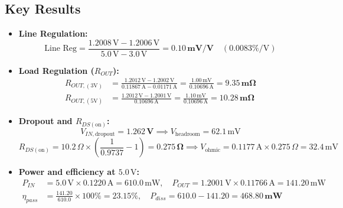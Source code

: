\documentclass[11pt,a4paper]{article}
\begin{document}
\subsection{Key Results}
\begin{itemize}[leftmargin=1.2em, itemsep=0.2em]
    \item \textbf{Line Regulation:}
    \begin{equation}
        \text{Line Reg} = \frac{1.2008\,\text{V} - 1.2006\,\text{V}}{5.0\,\text{V} - 3.0\,\text{V}} = \mathbf{0.10\,\text{mV/V}} \quad (0.0083\%\text{/V})
    \end{equation}
    \item \textbf{Load Regulation ($R_{OUT}$):}
    \begin{align}
        R_{OUT,(3\text{V})} &= \frac{1.2012\,\text{V} - 1.2002\,\text{V}}{0.11867\,\text{A} - 0.01171\,\text{A}} = \frac{1.00\,\text{mV}}{0.10696\,\text{A}} = \mathbf{9.35\,\text{m}\Omega} \\
        R_{OUT,(5\text{V})} &= \frac{1.2012\,\text{V} - 1.2001\,\text{V}}{0.10696\,\text{A}} = \frac{1.10\,\text{mV}}{0.10696\,\text{A}} = \mathbf{10.28\,\text{m}\Omega}
    \end{align}
    \item \textbf{Dropout and $R_{DS(\text{on})}$:}
    \begin{equation}
        V_{IN,\text{dropout}} = \mathbf{1.262\,\text{V}} \implies V_{\text{headroom}} = 62.1\,\text{mV}
    \end{equation}
    \begin{equation}
        R_{DS(\text{on})} = 10.2\,\Omega \times \left(\frac{1}{0.9737} - 1\right) = \mathbf{0.275\,\Omega} \implies V_{\text{ohmic}} = 0.1177\,\text{A} \times 0.275\,\Omega = 32.4\,\text{mV}
    \end{equation}
    \item \textbf{Power and efficiency at $5.0\,\text{V}$:}
    \begin{align}
        P_{IN} &= 5.0\,\text{V} \times 0.1220\,\text{A} = 610.0\,\text{mW}, \quad P_{OUT} = 1.2001\,\text{V} \times 0.11766\,\text{A} = 141.20\,\text{mW} \\
        \eta_{pass} &= \frac{141.20}{610.0} \times 100\% = \mathbf{23.15\%}, \quad P_{diss} = 610.0 - 141.20 = \mathbf{468.80\,\text{mW}}
    \end{align}
\end{itemize}
\end{document}
